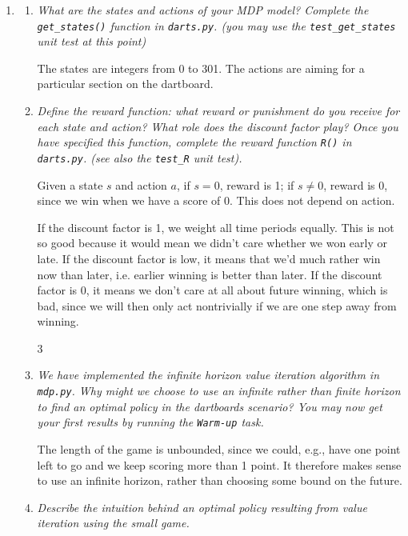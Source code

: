 \documentclass{article}
\newcommand{\edit}[1]{\colorbox{Yellow}{#1}}
\begin{document}
\begin{enumerate}
\item
  \begin{enumerate}
  \item \emph{What are the states and actions of your MDP model?
    Complete the \texttt{get\_states()} function in
    \texttt{darts.py}. (you may use the \texttt{test\_get\_states}
    unit test at this point)}

    The states are integers from 0 to 301. The actions are aiming for
    a particular section on the dartboard.

  \item \emph{Define the reward function: what reward or punishment do
    you receive for each state and action? What role does the discount
    factor play? Once you have specified this function, complete the
    reward function \texttt{R()} in \texttt{darts.py}. (see also the
    \texttt{test\_R} unit test).}

    Given a state $s$ and action $a$, if $s=0$, reward is 1; if $s\neq
    0$, reward is 0, since we win when we have a score of 0. This does
    not depend on action.

    If the discount factor is 1, we weight all time periods
    equally. This is not so good because it would mean we didn't care
    whether we won early or late. If the discount factor is low, it
    means that we'd much rather win now than later, i.e. earlier
    winning is better than later. If the discount factor is 0, it
    means we don't care at all about future winning, which is bad,
    since we will then only act nontrivially if we are one step away
    from winning.


    \setcounter{enumii}3
  \item \emph{We have implemented the infinite horizon value iteration
    algorithm in \texttt{mdp.py}. Why might we choose to use an
    infinite rather than finite horizon to find an optimal policy in
    the dartboards scenario?  You may now get your first results by
    running the \texttt{Warm-up} task.}

    The length of the game is unbounded, since we could, e.g., have
    one point left to go and we keep scoring more than 1 point. It
    therefore makes sense to use an infinite horizon, rather than
    choosing some bound on the future.

  \item \emph{Describe the intuition behind an optimal policy
    resulting from value iteration using the small game.}


\end{enumerate}
\end{enumerate}
\end{document}
